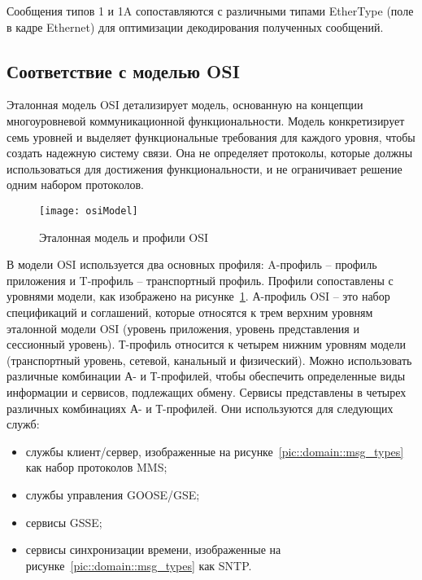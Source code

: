 Сообщения типов 1 и 1A сопоставляются с различными типами EtherType
(поле в кадре Ethernet) для оптимизации декодирования полученных сообщений.

\subsection{Соответствие с моделью OSI}


Эталонная модель OSI детализирует модель, основанную на концепции многоуровневой
коммуникационной функциональности. Модель конкретизирует семь уровней и выделяет
функциональные требования для каждого уровня, чтобы создать надежную систему связи.
Она не определяет протоколы, которые должны использоваться для достижения
функциональности, и не ограничивает решение одним набором протоколов.

\begin{figure}[ht]
    \centering
    \texttt{[image: osiModel]}
    \caption{Эталонная модель и профили OSI}
    \label{pic::domain::osi_model}
\end{figure}

В модели OSI используется два основных профиля: A-профиль -- профиль приложения
и T-профиль -- транспортный профиль. Профили сопоставлены с уровнями модели,
как изображено на рисунке~\ref{pic::domain::osi_model}. А-профиль OSI --
это набор спецификаций и соглашений, которые относятся к трем верхним уровням
эталонной модели OSI (уровень приложения, уровень представления и сессионный
уровень). Т-профиль относится к четырем нижним уровням модели
(транспортный уровень, сетевой, канальный и физический). Можно использовать
различные комбинации А- и Т-профилей, чтобы обеспечить определенные виды информации
и сервисов, подлежащих обмену. Сервисы представлены в четырех различных комбинациях
А- и Т-профилей. Они используются для следующих служб:

\begin{itemize}
    \item службы клиент/сервер, изображенные на рисунке~\ref{pic::domain::msg_types} как набор протоколов MMS;
    \item службы управления GOOSE/GSE;
    \item сервисы GSSE;
    \item сервисы синхронизации времени, изображенные на рисунке~\ref{pic::domain::msg_types} как SNTP.
\end{itemize}

